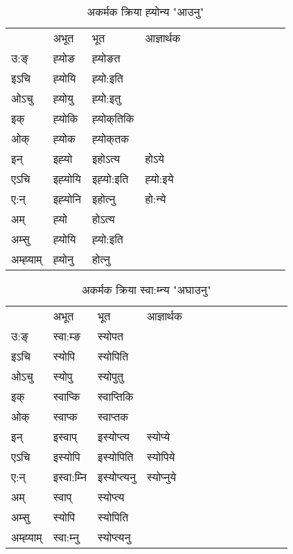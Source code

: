 \begin{table}[H]
\label{o.vi} \centering
\caption{अकर्मक क्रिया  ह्‍योन्य  "आउनु"  }
\begin{tabular}{l|l|l|l|l|l|l|l|l|l|l|l|l}  \toprule
&अभूत & भूत & आज्ञार्थक \\ 
उ:ङ्‌ &ह्‍योङ &ह्‍योङत \\ 
इऽचि &ह्‍योयि &ह्‍यो:इति   \\ 
ओऽचु &ह्‍योयु &ह्‍यो:इतु   \\ 
इक् &ह्‍योकि &ह्‍योक्‌तिकि   \\ 
ओक् &ह्‍योक &ह्‍योक्‌तक   \\ 
इन् & इह्‍यो & इहोऽत्य &होऽये  \\ 
एऽचि & इह्‍योयि & इह्‍यो:इति &ह्‍यो:इये    \\ 
ए:न् & इह्‍योनि  & इहोत्‍नु &हो:न्ये  \\ 
अम् & ह्‍यो & होऽत्य   \\ 
अम्सु & ह्‍योयि & ह्‍यो:इति     \\ 
अम्ह्‍याम् & ह्‍योनु  & होत्‍नु \\ 
\bottomrule
\end{tabular}
\end{table}


\begin{table}[H]
\label{op.vi} \centering
\caption{अकर्मक क्रिया  स्वा:म्‍न्य  "अघाउनु"  }
\begin{tabular}{l|l|l|l|l|l|l|l|l|l|l|l|l}  \toprule
&अभूत & भूत & आज्ञार्थक \\ 
उ:ङ्‌ &स्वा:म्ङ &स्योपत \\ 
इऽचि &स्योपि &स्योपिति   \\ 
ओऽचु &स्योपु &स्योपुतु   \\ 
इक् &स्वाप्कि &स्वाप्‍तिकि   \\ 
ओक् &स्वाप्क &स्वाप्‍तक   \\ 
इन् & इस्वाप् & इस्योप्‍त्य &स्योप्ये  \\ 
एऽचि & इस्योपि & इस्योपिति &स्योपिये    \\ 
ए:न् & इस्वा:म्‍नि  & इस्योप्‍त्यनु &स्योप्‍नुये  \\ 
अम् & स्वाप् & स्योप्‍त्य   \\ 
अम्सु & स्योपि & स्योपिति   \\ 
अम्ह्‍याम् & स्वा:म्‍नु  & स्योप्‍त्यनु \\ 
\bottomrule
\end{tabular}
\end{table}


